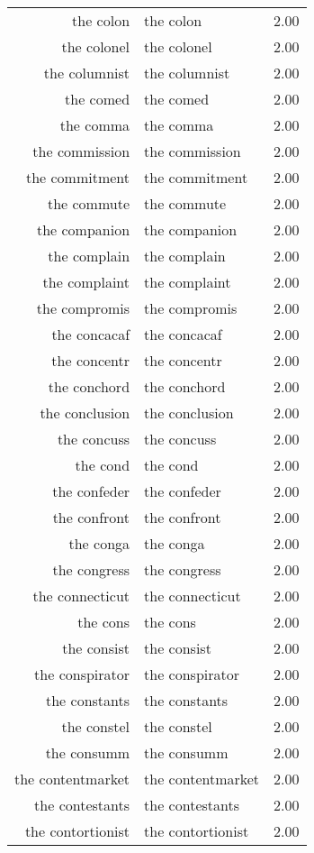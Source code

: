 \begin{table}[ht]
\begin{tabular}{rlr}
  the colon & the colon & 2.00 \\ 
  the colonel & the colonel & 2.00 \\ 
  the columnist & the columnist & 2.00 \\ 
  the comed & the comed & 2.00 \\ 
  the comma & the comma & 2.00 \\ 
  the commission & the commission & 2.00 \\ 
  the commitment & the commitment & 2.00 \\ 
  the commute & the commute & 2.00 \\ 
  the companion & the companion & 2.00 \\ 
  the complain & the complain & 2.00 \\ 
  the complaint & the complaint & 2.00 \\ 
  the compromis & the compromis & 2.00 \\ 
  the concacaf & the concacaf & 2.00 \\ 
  the concentr & the concentr & 2.00 \\ 
  the conchord & the conchord & 2.00 \\ 
  the conclusion & the conclusion & 2.00 \\ 
  the concuss & the concuss & 2.00 \\ 
  the cond & the cond & 2.00 \\ 
  the confeder & the confeder & 2.00 \\ 
  the confront & the confront & 2.00 \\ 
  the conga & the conga & 2.00 \\ 
  the congress & the congress & 2.00 \\ 
  the connecticut & the connecticut & 2.00 \\ 
  the cons & the cons & 2.00 \\ 
  the consist & the consist & 2.00 \\ 
  the conspirator & the conspirator & 2.00 \\ 
  the constants & the constants & 2.00 \\ 
  the constel & the constel & 2.00 \\ 
  the consumm & the consumm & 2.00 \\ 
  the contentmarket & the contentmarket & 2.00 \\ 
  the contestants & the contestants & 2.00 \\ 
  the contortionist & the contortionist & 2.00 \\ 

\end{tabular}
\end{table}
